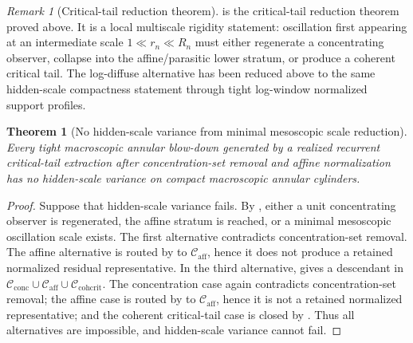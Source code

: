 \documentclass[11pt]{amsart}
\numberwithin{equation}{section}
\theoremstyle{plain}
\newtheorem{theorem}{Theorem}[section]
\theoremstyle{definition}
\theoremstyle{remark}
\newtheorem{remark}[remark]{Remark}
\newcommand{\Cactive}{\mathcal C_{\mathrm{conc}}}
\newcommand{\Caff}{\mathcal C_{\mathrm{aff}}}
\newcommand{\Ccohcrit}{\mathcal C_{\mathrm{cohcrit}}}
\begin{document}
\begin{remark}[Critical-tail reduction theorem]
\label{rem:remaining-hidden-scale-input}
 is the critical-tail reduction
theorem proved above.  It is a local multiscale rigidity statement: oscillation
first appearing at an intermediate scale
\(1\ll r_n\ll R_n\) must either regenerate a concentrating observer, collapse into
the affine/parasitic lower stratum, or produce a coherent critical tail.  The
log-diffuse alternative has been reduced above to the same hidden-scale compactness
statement through tight log-window normalized support profiles.
\end{remark}

\begin{theorem}[No hidden-scale variance from minimal mesoscopic scale reduction]
\label{thm:no-hidden-scale-variance-realized-defects}
Every tight macroscopic
annular blow-down generated by a realized recurrent critical-tail extraction
after concentration-set removal and affine normalization has no hidden-scale variance
on compact macroscopic annular cylinders.
\end{theorem}

\begin{proof}
Suppose that hidden-scale variance fails.  By
, either a unit concentrating observer is
regenerated, the affine stratum is reached, or a minimal mesoscopic oscillation scale
exists.  The first alternative contradicts concentration-set removal.  The affine
alternative is routed by  to
\(\Caff\), hence it does not produce a retained normalized residual
representative.  In the
third alternative,
 gives a descendant in
\(\Cactive\cup\Caff\cup\Ccohcrit\).  The concentration case again contradicts
concentration-set removal; the affine case is routed by
 to \(\Caff\), hence it is not a
retained normalized representative; and
the coherent critical-tail case is closed by
.  Thus all
alternatives are impossible, and hidden-scale variance cannot fail.
\end{proof}
\end{document}
